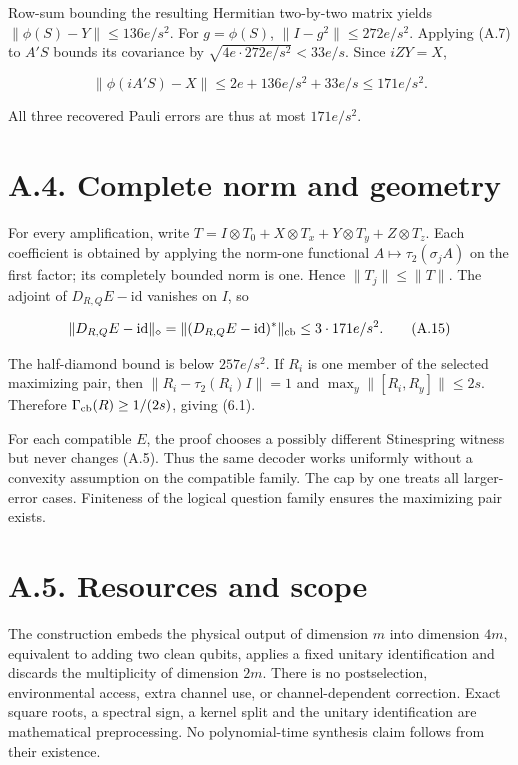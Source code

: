 \documentclass[11pt]{article}
\begin{document}
Row-sum bounding the resulting Hermitian two-by-two matrix yields
\(\|\phi(S)-Y\|\le136e/s^2\).
For \(g=\phi(S)\), \(\|I-g^2\|\le272e/s^2\). Applying (A.7) to
\(A'S\) bounds its covariance by
\(\sqrt{4e\cdot272e/s^2}<33e/s\). Since \(iZY=X\),

\[
\|\phi(iA'S)-X\|\le2e+136e/s^2+33e/s\le171e/s^2.
\tag{A.14}
\]

All three recovered Pauli errors are thus at most \(171e/s^2\).

\section*{A.4. Complete norm and geometry}

For every amplification, write
\(T=I\otimes T_0+X\otimes T_x+Y\otimes T_y+Z\otimes T_z\).
Each coefficient is obtained by applying the norm-one functional
\(A\mapsto\tau_2(\sigma_jA)\) on the first factor; its completely
bounded norm is one. Hence \(\|T_j\|\le\|T\|\). The adjoint of
\(D_{R,Q}E-\mathrm{id}\) vanishes on \(I\), so

\[
\|D_{R,Q}E-\mathrm{id}\|_\diamond
=\|(D_{R,Q}E-\mathrm{id})^*\|_{\rm cb}
\le3\cdot171e/s^2.
\tag{A.15}
\]

The half-diamond bound is below \(257e/s^2\). If \(R_i\) is one member
of the selected maximizing pair, then
\(\|R_i-\tau_2(R_i)I\|=1\) and
\(\max_y\|[R_i,R_y]\|\le2s\). Therefore
\(\Gamma_{\rm cb}(R)\ge1/(2s)\), giving (6.1).

For each compatible \(E\), the proof chooses a possibly different
Stinespring witness but never changes (A.5). Thus the same decoder works
uniformly without a convexity assumption on the compatible family. The cap
by one treats all larger-error cases. Finiteness of the logical question
family ensures the maximizing pair exists.

\section*{A.5. Resources and scope}

The construction embeds the physical output of dimension \(m\) into
dimension \(4m\), equivalent to adding two clean qubits, applies a fixed
unitary identification and discards the multiplicity of dimension \(2m\).
There is no postselection, environmental access, extra channel use, or
channel-dependent correction. Exact square roots, a spectral sign, a kernel
split and the unitary identification are mathematical preprocessing. No
polynomial-time synthesis claim follows from their existence.
\end{document}
